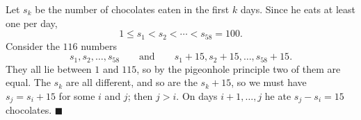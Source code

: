 Let $s_k$ be the number of chocolates eaten in the first $k$ days. Since he eats at least one per day,
\[1\le s_1<s_2<\cdots<s_{58}=100.\]
Consider the $116$ numbers
\[s_1,s_2,\dots,s_{58}\qquad\text{and}\qquad s_1+15,s_2+15,\dots,s_{58}+15.\]
They all lie between $1$ and $115$, so by the pigeonhole principle two of them are equal. The $s_k$ are all different, and so are the $s_k+15$, so we must have $s_j=s_i+15$ for some $i$ and $j$; then $j>i$. On days $i+1,\dots,j$ he ate $s_j-s_i=15$ chocolates. $\blacksquare$
